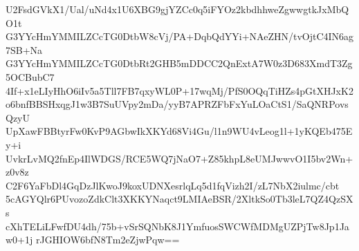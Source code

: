 U2FsdGVkX1/Ual/uNd4x1U6XBG9gjYZCc0q5iFYOz2kbdhhweZgwwgtkJxMbQO1t
G3YYcHmYMMILZCcTG0DtbW8cVj/PA+DqbQdYYi+NAeZHN/tvOjtC4IN6ag7SB+Na
G3YYcHmYMMILZCcTG0DtbRt2GHB5mDDCC2QnExtA7W0z3D683XmdT3Zg5OCBubC7
4If+x1eLIyHhO6iIv5a5Tll7FB7qxyWL0P+17wqMj/PfS0OQqTiHZs4pGtXHJxK2
o6bnfBBSHxqgJ1w3B7SuUVpy2mDa/yyB7APRZFbFxYuLOaCtS1/SaQNRPovsQzyU
UpXawFBBtyrFw0KvP9AGbwIkXKYd68Vi4Gu/l1n9WU4vLeog1l+1yKQEb475Ey+i
UvkrLvMQ2fnEp4IlWDGS/RCE5WQ7jNaO7+Z85khpL8eUMJwwvO1I5bv2Wn+z0v8z
C2F6YaFbDl4GqDzJlKwoJ9koxUDNXesrlqLq5d1fqVizh2I/zL7NbX2iulmc/cbt
5cAGYQlr6PUvozoZdkClt3XKKYNaqct9LMIAeBSR/2XltkSo0Tb3leL7QZ4QzSXs
cXhTELiLFwfDU4dh/75b+vSrSQNbK8J1YmfuosSWCWfMDMgUZPjTw8Jp1Jaw0+1j
rJGHIOW6bfN8Tm2eZjwPqw==
